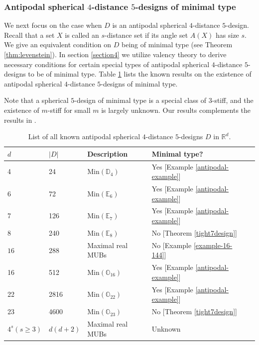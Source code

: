 \documentclass[11pt]{article}
\theoremstyle{definition}
\theoremstyle{remark}
\begin{document}
\subsubsection{Antipodal spherical $4$-distance $5$-designs of minimal type}

We next focus on the case when $D$ is an antipodal spherical $4$-distance $5$-design. 
Recall that a set $X$ is called an $s$-distance set if its angle set $A(X)$ has size $s$.
We give an equivalent condition on $D$ being of minimal type (see Theorem \ref{thm:levenstein}). 
In section \ref{section4} we utilize valency theory to derive necessary conditions for certain special types of antipodal spherical $4$-distance $5$-designs to be of minimal type.
Table \ref{Levenstein-equality packing} lists the known results on the existence of  antipodal spherical $4$-distance $5$-designs of minimal type.


Note that a spherical $5$-design of minimal type is a special class of $3$-stiff, and the existence of $m$-stiff for small $m$ is largely unknown.
Our results complements the results in \cite{BKN26}.  


\begin{table}[!h]
\caption{List of all known antipodal spherical $4$-distance $5$-designs $D$ in $\mathbb{R}^d$.}
\centering
\label{Levenstein-equality packing}
\begin{tabular}{lllll}
 $d$ & $|D|$   & Description  & Minimal type?  \\ \hline
  4  &  24     & $\mathrm{Min}(\mathbb{D}_4)$  & Yes  [Example \ref{antipodal-example}]      \\ \hline
 6  &   72            &  $\mathrm{Min}(\mathbb{E}_6)$  &  Yes [Example \ref{antipodal-example}]   \\ \hline
 7 &   126       & $\mathrm{Min}(\mathbb{E}_7)$   & Yes [Example \ref{antipodal-example}]   \\ \hline
 8 &  240      &  $\mathrm{Min}(\mathbb{E}_8)$      & No [Theorem \ref{tight7design}]      \\ \hline
 $16$  &   $288$     & Maximal real MUBs    &   No  [Example \ref{example-16-144}]    \\ \hline
 16  &    512           & $\mathrm{Min}(\mathbb{O}_{16})$  &  Yes [Example \ref{antipodal-example}]             \\ \hline
22  &   2816       &  $\mathrm{Min}(\mathbb{O}_{22})$    &    Yes [Example \ref{antipodal-example}]        \\ \hline
 23 &  4600       &  $\mathrm{Min}(\mathbb{O}_{23})$     & No [Theorem \ref{tight7design}]        \\ \hline
  $4^s (s\geq3)$  &   $d(d+2)$    & Maximal real MUBs    &   Unknown    \\ \hline
\end{tabular}
\end{table}
\end{document}
